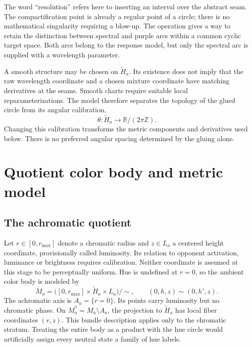 \documentclass[9pt,twocolumn,twoside]{opticajnl}
\theoremstyle{plain}
\newcommand{\R}{\mathbb{R}}
\begin{document}
The word ``resolution'' refers here to inserting an interval over the abstract seam. The compactification point is already a regular point of a circle; there is no mathematical singularity requiring a blow-up. The operation gives a way to retain the distinction between spectral and purple arcs within a common cyclic target space. Both arcs belong to the response model, but only the spectral arc is supplied with a wavelength parameter.

A smooth structure may be chosen on $\widetilde H_a$. Its existence does not imply that the raw wavelength coordinate and a chosen mixture coordinate have matching derivatives at the seams. Smooth charts require suitable local reparameterizations. The model therefore separates the topology of the glued circle from its angular calibration,
\begin{equation}
 \theta:\widetilde H_a\longrightarrow\R/(2\pi\mathbb Z).
 \label{eq:hue-angle}
\end{equation}
Changing this calibration transforms the metric components and derivatives used below. There is no preferred angular spacing determined by the gluing alone.

\section{Quotient color body and metric model}
\label{sec:body}
\subsection{The achromatic quotient}
Let $r\in[0,r_{\max}]$ denote a chromatic radius and $z\in L_a$ a centered height coordinate, provisionally called luminosity. Its relation to opponent activation, luminance or brightness requires calibration. Neither coordinate is assumed at this stage to be perceptually uniform. Hue is undefined at $r=0$, so the ambient color body is modeled by
\begin{equation}
 M_a=\bigl([0,r_{\max}]\times\widetilde H_a\times L_a\bigr)/\sim,
 \qquad (0,h,z)\sim(0,h',z).
 \label{eq:quotient}
\end{equation}
The achromatic axis is $A_a=\{r=0\}$. Its points carry luminosity but no chromatic phase. On $M_a^*=M_a\setminus A_a$, the projection to $\widetilde H_a$ has local fiber coordinates $(r,z)$. This bundle description applies only to the chromatic stratum. Treating the entire body as a product with the hue circle would artificially assign every neutral state a family of hue labels.
\end{document}
